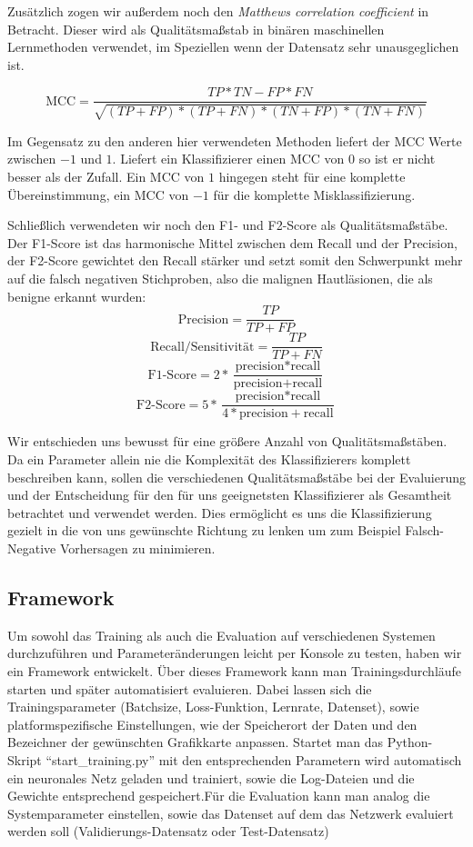 Zusätzlich zogen wir außerdem noch den \textit{Matthews correlation coefficient} in Betracht. Dieser wird als Qualitätsmaßstab in binären maschinellen Lernmethoden verwendet, im Speziellen wenn der Datensatz sehr unausgeglichen ist. 

\[\text{MCC} = \frac{TP*TN - FP*FN}{\sqrt{(TP+FP)*(TP+FN)*(TN+FP)*(TN+FN)}}\]

Im Gegensatz zu den anderen hier verwendeten Methoden liefert der MCC Werte zwischen $-1$ und $1$. Liefert ein Klassifizierer einen MCC von $0$ so ist er nicht besser als der Zufall. Ein MCC von $1$ hingegen steht für eine komplette Übereinstimmung, ein MCC von $-1$ für die komplette Misklassifizierung.

Schließlich verwendeten wir noch den F1- und F2-Score als Qualitätsmaßstäbe. Der F1-Score ist das harmonische Mittel zwischen dem Recall und der Precision, der F2-Score gewichtet den Recall stärker und setzt somit den Schwerpunkt mehr auf die falsch negativen Stichproben, also die malignen Hautläsionen, die als benigne erkannt wurden:
	\[\text{Precision} = \frac{TP}{TP+FP}\]
    \[\text{Recall/Sensitivität} = \frac{TP}{TP+FN}\]
	\[\text{F1-Score} = 2*\frac{\text{precision}*\text{recall}}	{\text{precision}+\text{recall}}\]
   	\[\text{F2-Score} = 5*\frac{\text{precision}*\text{recall}}	{4*\text{precision}+\text{recall}}\]
    
Wir entschieden uns bewusst für eine größere Anzahl von Qualitätsmaßstäben. Da ein Parameter allein nie die Komplexität des Klassifizierers komplett beschreiben kann, sollen die verschiedenen Qualitätsmaßstäbe bei der Evaluierung und der Entscheidung für den für uns geeignetsten Klassifizierer als Gesamtheit betrachtet und verwendet werden. Dies ermöglicht es uns die Klassifizierung gezielt in die von uns gewünschte Richtung zu lenken um zum Beispiel Falsch-Negative Vorhersagen zu minimieren.

\subsection{Framework}

Um sowohl das Training als auch die Evaluation auf verschiedenen Systemen durchzuführen und Parameteränderungen leicht per Konsole zu testen, haben wir ein Framework entwickelt. Über dieses Framework kann man Trainingsdurchläufe starten und später automatisiert evaluieren. Dabei lassen sich die Trainingsparameter (Batchsize, Loss-Funktion, Lernrate, Datenset), sowie platformspezifische Einstellungen, wie der Speicherort der Daten und den Bezeichner der gewünschten Grafikkarte anpassen. Startet man das Python-Skript ``start\_training.py'' mit den entsprechenden Parametern wird automatisch ein neuronales Netz geladen und trainiert, sowie die Log-Dateien und die Gewichte entsprechend gespeichert.Für die Evaluation kann man analog die Systemparameter einstellen, sowie das Datenset auf dem das Netzwerk evaluiert werden soll (Validierungs-Datensatz oder Test-Datensatz)

